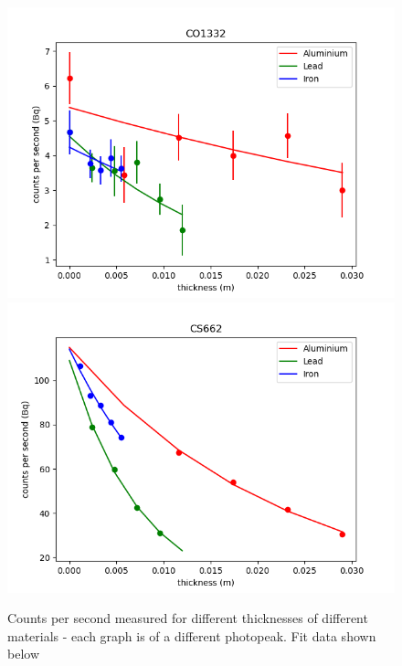\documentclass[12pt, a4paper]{article}
\begin{document}
\begin{figure}[H]
		\includegraphics[scale=0.4]{assets/CO1332.png}
		\includegraphics[scale=0.4]{assets/CS662.png}
		\caption{Counts per second measured for different thicknesses of different materials - each graph is of a different photopeak. Fit data shown below}
	\end{figure}
\end{document}
